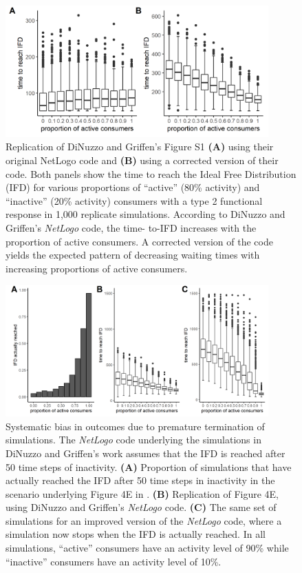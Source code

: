 \begin{refsection}
	\begin{figure}[!h]
		\centering
		\includegraphics[width=0.9\textwidth]{figures/boxes/details1.png}
		\caption{
			Replication of DiNuzzo and Griffen's Figure S1 \textbf{(A)} using their original NetLogo code and \textbf{(B)} using a corrected version of their code. 
			Both panels show the time to reach the Ideal Free Distribution (IFD) for various proportions of ``active'' (80\% activity) and ``inactive'' (20\% activity) consumers with a type 2 functional response in 1,000 replicate simulations. 
			According to DiNuzzo and Griffen's \textit{NetLogo} code, the time- to-IFD increases with the proportion of active consumers. 
			A corrected version of the code yields the expected pattern of decreasing waiting times with increasing proportions of active consumers.
		}\label{fig_details_01}
	\end{figure}

	\begin{figure}[!h]
		\centering
		\includegraphics[width=0.9\textwidth]{figures/boxes/details2.png}
		\caption{
			Systematic bias in outcomes due to premature termination of simulations. 
			The \textit{NetLogo} code underlying the simulations in DiNuzzo and Griffen's work assumes that the IFD is reached after 50 time steps of inactivity. 
			\textbf{(A)} Proportion of simulations that have actually reached the IFD after 50 time steps in inactivity in the scenario underlying Figure 4E in \citet{dinuzzo2020}. 
			\textbf{(B)} Replication of Figure 4E, using DiNuzzo and Griffen's \textit{NetLogo} code. 
			\textbf{(C)} The same set of simulations for an improved version of the \textit{NetLogo} code, where a simulation now stops when the IFD is actually reached. 
			In all simulations, ``active'' consumers have an activity level of 90\% while ``inactive'' consumers have an activity level of 10\%.
		}\label{fig_details_02}
	\end{figure}


\end{refsection}
